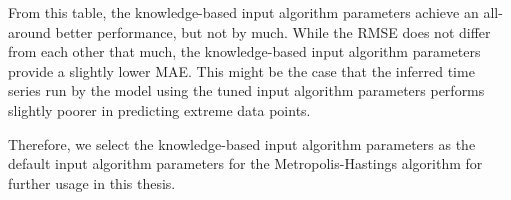From this table, the knowledge-based input algorithm parameters achieve an all-around better performance, but not by much. While the RMSE does not differ from each other that much, the knowledge-based input algorithm parameters provide a slightly lower MAE. This might be the case that the inferred time series run by the model using the tuned input algorithm parameters performs slightly poorer in predicting extreme data points.

Therefore, we select the knowledge-based input algorithm parameters as the default input algorithm parameters for the Metropolis-Hastings algorithm for further usage in this thesis.



